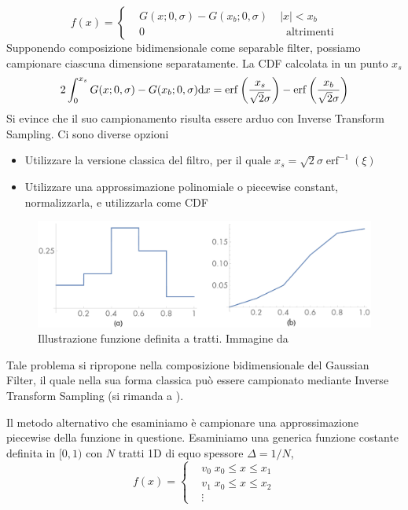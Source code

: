 \begin{equation}
	f(x)=\left\{\begin{aligned}
		&G(x;0,\sigma)-G(x_b;0,\sigma)\;&|x|<x_b\\
		&0 &\;\;\mathrm{altrimenti}
	\end{aligned}\right.
\end{equation}
Supponendo composizione bidimensionale come separable filter, possiamo campionare ciascuna dimensione separatamente. La CDF calcolata in un punto $x_s$
\begin{equation}
	2\int_0^{x_s}G(x;0,\sigma)-G(x_b;0,\sigma)\mathrm{d}x=\operatorname{erf}\left(\frac{x_s}{\sqrt{2}\sigma}\right)-
		\operatorname{erf}\left(\frac{\-x_b}{\sqrt{2}\sigma}\right)
\end{equation}
Si evince che il suo campionamento risulta essere arduo con Inverse Transform Sampling. Ci sono diverse opzioni
\begin{itemize}[topsep=0pt,noitemsep]
	\item Utilizzare la versione classica del filtro, per il quale $x_s=\sqrt{2}\sigma\operatorname{erf}^{-1}(\xi)$ \cite{pegoraro}
	\item Utilizzare una approssimazione polinomiale o piecewise constant, normalizzarla, e utilizzarla come CDF \cite{pharr}
\end{itemize}
\begin{figure}[tb]
	\centering 
	\includegraphics[width=0.8\linewidth]{../assets/chapter5_reconstruction_piecewise.png}
	\caption{Illustrazione funzione definita a tratti. Immagine da \cite{pharr}}
	\label{chapter5:reconstruction:piecewisePDF}
\end{figure}
Tale problema si ripropone nella composizione bidimensionale del Gaussian Filter, il quale nella sua forma classica pu\`o essere campionato mediante 
Inverse Transform Sampling (si rimanda a \cite{pegoraro}).\par
Il metodo alternativo che esaminiamo \`e campionare una approssimazione piecewise della funzione in questione. Esaminiamo una generica funzione 
costante definita in $[0,1)$ con $N$ tratti 1D di equo spessore $\Delta=1/N$, 
\begin{equation}
	f(x)=\left\{\begin{aligned}
		&v_0\;x_0\leq x\leq x_1\\
		&v_1\;x_0\leq x\leq x_2\\
		&\vdots
	\end{aligned}\right.
\end{equation}
